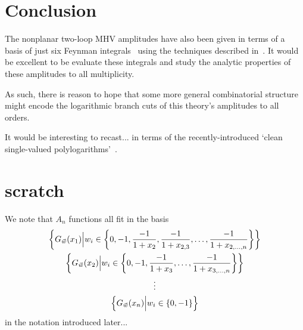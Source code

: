 \documentclass[11pt]{article}
\begin{document}
\section{Conclusion}

The nonplanar two-loop MHV amplitudes have also been given in terms of a basis of just six Feynman integrals~\cite{Bourjaily:2019iqr,Bourjaily:2019gqu} using the techniques described in~\cite{Bourjaily:2017wjl,Bourjaily:2020qca}. It would be excellent to be evaluate these integrals and study the analytic properties of these amplitudes to all multiplicity. 


As such, there is reason to hope that some more general combinatorial structure might encode the logarithmic branch cuts of this theory's amplitudes to all orders.  



It would be interesting to recast... in terms of the recently-introduced `clean single-valued polylogarithms'~\cite{Charlton:2021uhu}.


\section{scratch}



We note that $A_n$ functions all fit in the basis
\begin{gather}
\left\{G_{\vec{\hspace{.0cm} w}}(x_1) \Big| w_i \in \left\{0, - 1, \frac{-1}{1 + x_2}, \frac{-1}{1 + x_{2,3}}, \dots , \frac{-1}{1 + x_{2,\dots,n}} \right\} \right\} \nonumber \\
\left\{G_{\vec{\hspace{.0cm} w}}(x_2) \Big| w_i \in \left\{0, - 1, \frac{-1}{1 + x_3}, \dots , \frac{-1}{1 + x_{3,\dots,n}} \right\} \right\} \\
\vdots \nonumber \\ 
\left\{G_{\vec{\hspace{.0cm} w}}(x_n) \Big| w_i \in \left\{0, - 1 \right\} \right\} \nonumber
\end{gather}
in the notation introduced later...
\end{document}
